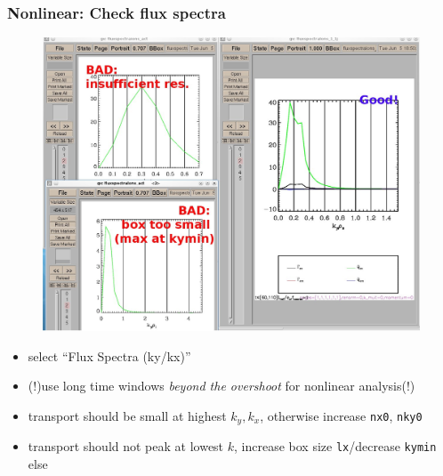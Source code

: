 \documentclass[10pt]{beamer}
\begin{document}
\begin{frame}
  \frametitle{Nonlinear: Check flux spectra}

\begin{figure}
\includegraphics[height=0.6\textheight]{figs/fluxspectra.jpg}
\end{figure}

\begin{block}{}
\begin{itemize}
 \item select ``Flux Spectra (ky/kx)''
 \item (!)use long time windows {\em beyond the overshoot} for nonlinear analysis(!)
 \item transport should be small at highest $k_y, k_x$, otherwise increase {\tt nx0}, {\tt nky0}
 \item transport should not peak at lowest $k$, increase box size {\tt lx}/decrease {\tt kymin} else
\end{itemize}

\end{block}


\end{frame}

\end{document}
